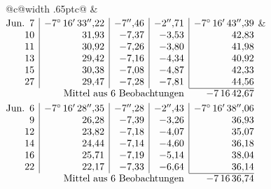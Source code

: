 \noindent\begin{tabular}{@{}c@{\hspace{.4em}\vrule width .65pt\hspace{.4em}}c@{}}
 &
 \\[.18ex]
\(\begin{array}[t]{@{}r|r|r|r|r@{}}
\text{Jun.}\enspace 7 & -7^\circ\,16'\,33''{,}22 & -7''{,}46 & -2''{,}71 & -7^\circ\,16'\,43''{,}39\\
10 & 31{,}93 & -7{,}37 & -3{,}53 & 42{,}83\\
11 & 30{,}92 & -7{,}26 & -3{,}80 & 41{,}98\\
13 & 29{,}42 & -7{,}16 & -4{,}34 & 40{,}92\\
15 & 30{,}38 & -7{,}08 & -4{,}87 & 42{,}33\\
27 & 29{,}47 & -7{,}28 & -7{,}81 & 44{,}56\\
\cline{5-5}
\multicolumn{4}{r}{\text{Mittel aus 6 Beobachtungen}} & -7\,16\,42{,}67
\end{array}\)
&
\(\begin{array}[t]{@{}r|r|r|r|r@{}}
\text{Jun.}\enspace 6 & -7^\circ\,16'\,28''{,}35 & -7''{,}28 & -2''{,}43 & -7^\circ\,16'\,38''{,}06\\
9 & 26{,}28 & -7{,}39 & -3{,}26 & 36{,}93\\
12 & 23{,}82 & -7{,}18 & -4{,}07 & 35{,}07\\
14 & 24{,}44 & -7{,}14 & -4{,}60 & 36{,}18\\
16 & 25{,}71 & -7{,}19 & -5{,}14 & 38{,}04\\
22 & 22{,}17 & -7{,}33 & -6{,}64 & 36{,}14\\
\cline{5-5}
\multicolumn{4}{r}{\text{Mittel aus 6 Beobachtungen}} & -7\,16\,36{,}74
\end{array}\)
\end{tabular}\par\medskip
{}

